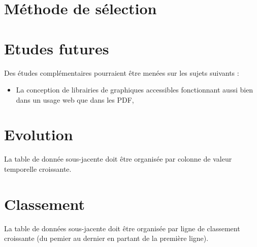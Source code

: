\documentclass[a4paper,12pt]{article}
\begin{document}
\begin{multicols}{2}
\section*{Méthode de sélection}
\label{sec:orga912275}

\section*{Etudes futures}
\label{sec:orgb0b31a2}
Des études complémentaires pourraient être menées sur les sujets suivants :
\begin{itemize}
\item La conception de librairies de graphiques accessibles fonctionnant aussi bien dans un usage web que dans les PDF,
\end{itemize}
\section*{Evolution}
\label{sec:orgc3c7282}
La table de donnée sous-jacente doit être organisée par colonne de valeur temporelle croissante.
\section*{Classement}
\label{sec:org99af522}
La table de données sous-jacente doit être organisée par ligne de classement croissante (du pemier au dernier en partant de la première ligne).


\end{multicols}

\newpage

\printbibliography
\end{document}
